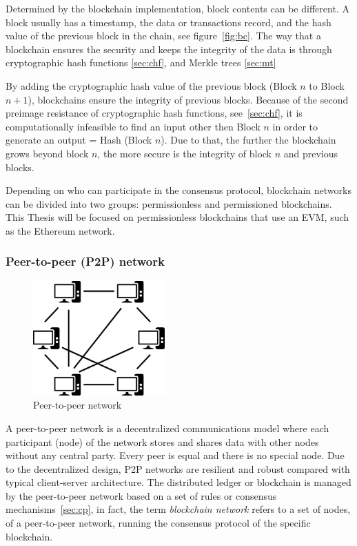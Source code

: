 \documentclass[11pt,a4paper]{report}
\begin{document}
Determined by the blockchain implementation, block contents can be different. A block usually has a timestamp, the data or transactions record, and the hash value of the previous block in the chain, see figure~\ref{fig:bc}.
The way that a blockchain ensures the security and keeps the integrity of the data is through cryptographic hash functions \ref{sec:chf}, and Merkle trees \ref{sec:mt}

By adding the cryptographic hash value of the previous block  (Block $n$ to Block $n+1$), blockchains ensure the integrity of previous blocks. Because of the second preimage resistance of cryptographic hash functions, see~\ref{sec:chf}, it is computationally infeasible to  find an input other then Block $n$ in order to generate an output = Hash (Block $n$). Due to that, the further the blockchain grows beyond block $n$, the more secure is the integrity of block $n$ and previous blocks.

Depending on who can participate in the consensus protocol, blockchain networks can be divided into two groups: permissionless and permissioned blockchains. This Thesis will be focused on permissionless blockchains that use an EVM, such as the Ethereum network.

\subsubsection{Peer-to-peer (P2P) network}\label{subsec:p2p}
\begin{figure}[htp]
	\centering
	\includegraphics[width=0.45\textwidth]{./images/p2p}
	\caption{Peer-to-peer network\cite{wiki:Peer-to-peer}}
	\label{fig:p2p}
\end{figure}
A peer-to-peer network\cite{wiki:Peer-to-peer}\cite{book:masteringBTCp2p} is a decentralized communications model where each participant (node) of the network stores and shares data with other nodes without any central party. Every peer is equal and there is no special node. Due to the decentralized design, P2P networks are resilient and robust compared with typical client-server architecture. The distributed ledger or blockchain is managed by the peer-to-peer network based on a set of rules or consensus mechanisms~\ref{sec:cp}, in fact, the term \emph{blockchain network} refers to a set of nodes, of a peer-to-peer network, running the consensus protocol of the specific blockchain. 
\end{document}
